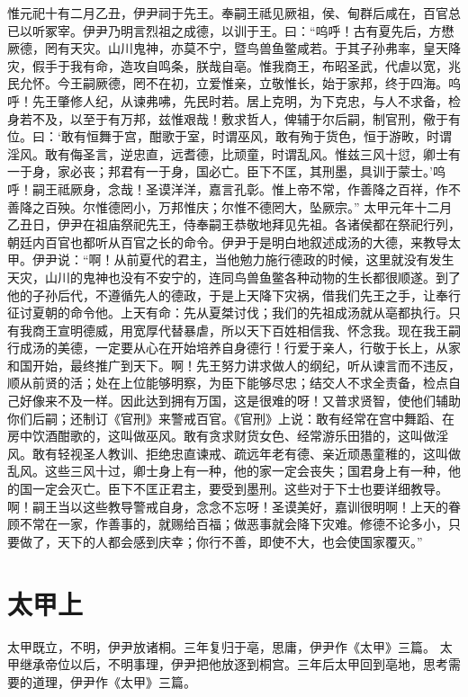 \documentclass[a4paper,12pt,UTF8,twoside]{ctexbook}
\begin{document}
惟元祀十有二月乙丑，伊尹祠于先王。奉嗣王祗见厥祖，侯、甸群后咸在，百官总已以听冢宰。伊尹乃明言烈祖之成德，以训于王。曰：“呜呼！古有夏先后，方懋厥德，罔有天灾。山川鬼神，亦莫不宁，暨鸟兽鱼鳖咸若。于其子孙弗率，皇天降灾，假手于我有命，造攻自鸣条，朕哉自亳。惟我商王，布昭圣武，代虐以宽，兆民允怀。今王嗣厥德，罔不在初，立爱惟亲，立敬惟长，始于家邦，终于四海。呜呼！先王肇修人纪，从谏弗咈，先民时若。居上克明，为下克忠，与人不求备，检身若不及，以至于有万邦，兹惟艰哉！敷求哲人，俾辅于尔后嗣，制官刑，儆于有位。曰：‘敢有恒舞于宫，酣歌于室，时谓巫风，敢有殉于货色，恒于游畋，时谓淫风。敢有侮圣言，逆忠直，远耆德，比顽童，时谓乱风。惟兹三风十愆，卿士有一于身，家必丧；邦君有一于身，国必亡。臣下不匡，其刑墨，具训于蒙士。’呜呼！嗣王祗厥身，念哉！圣谟洋洋，嘉言孔彰。惟上帝不常，作善降之百祥，作不善降之百殃。尔惟德罔小，万邦惟庆；尔惟不德罔大，坠厥宗。”
太甲元年十二月乙丑日，伊尹在祖庙祭祀先王，侍奉嗣王恭敬地拜见先祖。各诸侯都在祭祀行列，朝廷内百官也都听从百官之长的命令。伊尹于是明白地叙述成汤的大德，来教导太甲。伊尹说：“啊！从前夏代的君主，当他勉力施行德政的时候，这里就没有发生天灾，山川的鬼神也没有不安宁的，连同鸟兽鱼鳖各种动物的生长都很顺遂。到了他的子孙后代，不遵循先人的德政，于是上天降下灾祸，借我们先王之手，让奉行征讨夏朝的命令他。上天有命：先从夏桀讨伐；我们的先祖成汤就从亳都执行。只有我商王宣明德威，用宽厚代替暴虐，所以天下百姓相信我、怀念我。现在我王嗣行成汤的美德，一定要从心在开始培养自身德行！行爱于亲人，行敬于长上，从家和国开始，最终推广到天下。啊！先王努力讲求做人的纲纪，听从谏言而不违反，顺从前贤的活；处在上位能够明察，为臣下能够尽忠；结交人不求全责备，检点自己好像来不及一样。因此达到拥有万国，这是很难的呀！又普求贤智，使他们辅助你们后嗣；还制订《官刑》来警戒百官。《官刑》上说：敢有经常在宫中舞蹈、在房中饮酒酣歌的，这叫做巫风。敢有贪求财货女色、经常游乐田猎的，这叫做淫风。敢有轻视圣人教训、拒绝忠直谏戒、疏远年老有德、亲近顽愚童稚的，这叫做乱风。这些三风十过，卿士身上有一种，他的家一定会丧失；国君身上有一种，他的国一定会灭亡。臣下不匡正君主，要受到墨刑。这些对于下士也要详细教导。啊！嗣王当以这些教导警戒自身，念念不忘呀！圣谟美好，嘉训很明啊！上天的眷顾不常在一家，作善事的，就赐给百福；做恶事就会降下灾难。修德不论多小，只要做了，天下的人都会感到庆幸；你行不善，即使不大，也会使国家覆灭。”

\chapter{太甲上}

太甲既立，不明，伊尹放诸桐。三年复归于亳，思庸，伊尹作《太甲》三篇。
太甲继承帝位以后，不明事理，伊尹把他放逐到桐宫。三年后太甲回到亳地，思考需要的道理，伊尹作《太甲》三篇。
\end{document}

